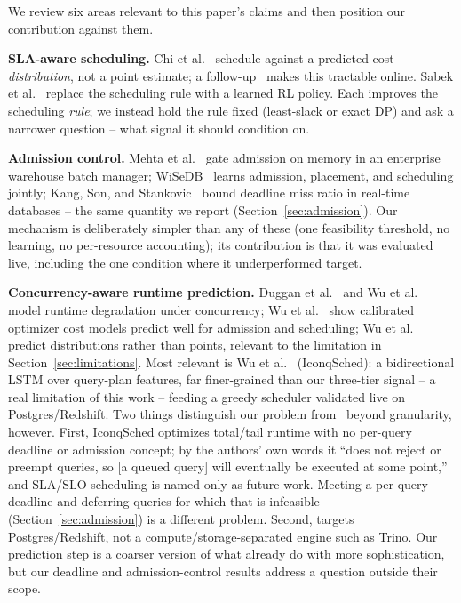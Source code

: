 \documentclass[conference]{IEEEtran}
\begin{document}
We review six areas relevant to this paper's claims and then position our contribution against them.

\textbf{SLA-aware scheduling.} Chi et al.~\cite{chi2013distribution} schedule against a predicted-cost \emph{distribution}, not a point estimate; a follow-up~\cite{chi2011icbs} makes this tractable online. Sabek et al.~\cite{sabek2022lsched} replace the scheduling rule with a learned RL policy. Each improves the scheduling \emph{rule}; we instead hold the rule fixed (least-slack or exact DP) and ask a narrower question -- what signal it should condition on.

\textbf{Admission control.} Mehta et al.~\cite{mehta2008biworkload} gate admission on memory in an enterprise warehouse batch manager; WiSeDB~\cite{marcus2016wisedb} learns admission, placement, and scheduling jointly; Kang, Son, and Stankovic~\cite{kang2004deadline} bound deadline miss ratio in real-time databases -- the same quantity we report (Section~\ref{sec:admission}). Our mechanism is deliberately simpler than any of these (one feasibility threshold, no learning, no per-resource accounting); its contribution is that it was evaluated live, including the one condition where it underperformed target.

\textbf{Concurrency-aware runtime prediction.} Duggan et al.~\cite{duggan2011performance} and Wu et al.~\cite{wu2013towards} model runtime degradation under concurrency; Wu et al.~\cite{wu2013predicting} show calibrated optimizer cost models predict well for admission and scheduling; Wu et al.~\cite{wu2014uncertainty} predict distributions rather than points, relevant to the limitation in Section~\ref{sec:limitations}. Most relevant is Wu et al.~\cite{wu2025iconqsched} (IconqSched): a bidirectional LSTM over query-plan features, far finer-grained than our three-tier signal -- a real limitation of this work -- feeding a greedy scheduler validated live on Postgres/Redshift. Two things distinguish our problem from~\cite{wu2025iconqsched} beyond granularity, however. First, IconqSched optimizes total/tail runtime with no per-query deadline or admission concept; by the authors' own words it ``does not reject or preempt queries, so [a queued query] will eventually be executed at some point,'' and SLA/SLO scheduling is named only as future work. Meeting a per-query deadline and deferring queries for which that is infeasible (Section~\ref{sec:admission}) is a different problem. Second, \cite{wu2025iconqsched} targets Postgres/Redshift, not a compute/storage-separated engine such as Trino. Our prediction step is a coarser version of what \cite{duggan2011performance,wu2013towards,wu2025iconqsched} already do with more sophistication, but our deadline and admission-control results address a question outside their scope.
\end{document}
